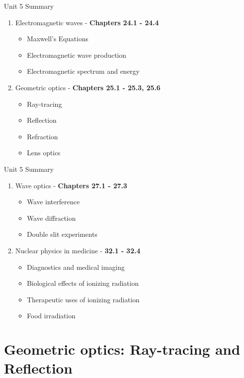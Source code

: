 \documentclass{beamer}
\begin{document}
\begin{frame}{Unit 5 Summary}
\begin{enumerate}
\item Electromagnetic waves - \textbf{Chapters 24.1 - 24.4}
\begin{itemize}
\item Maxwell's Equations
\item Electromagnetic wave production
\item Electromagnetic spectrum and energy
\end{itemize}
\item Geometric optics - \textbf{Chapters 25.1 - 25.3, 25.6}
\begin{itemize}
\item Ray-tracing
\item Reflection
\item Refraction
\item Lens optics
\end{itemize}
\end{enumerate}
\end{frame}

\begin{frame}{Unit 5 Summary}
\begin{enumerate}
\item Wave optics - \textbf{Chapters 27.1 - 27.3}
\begin{itemize}
\item Wave interference
\item Wave diffraction
\item Double slit experiments
\end{itemize}
\item Nuclear physics in medicine - \textbf{32.1 - 32.4}
\begin{itemize}
\item Diagnostics and medical imaging
\item Biological effects of ionizing radiation
\item Therapeutic uses of ionizing radiation
\item Food irradiation
\end{itemize}
\end{enumerate}
\end{frame}

\section{Geometric optics: Ray-tracing and Reflection}
\end{document}
